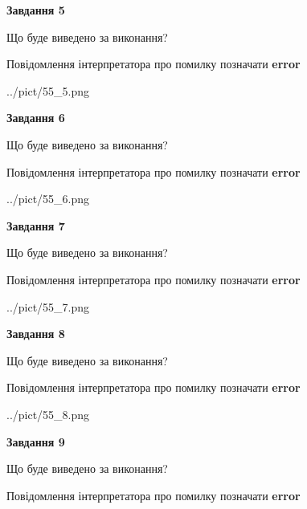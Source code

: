 \documentclass[11pt, ukrainian]{article}
\begin{document}
{\begin {large}
{\begin {center}\textbf{Завдання 5}\end {center}}\par
Що буде виведено за виконання? \par
Повідомлення інтерпретатора про помилку позначати \textbf{error}

\begin{center}
	{../pict/55_5.png}
\end{center}
\newpage

{\begin {center}\textbf{Завдання 6}\end {center}}\par
Що буде виведено за виконання? \par
Повідомлення інтерпретатора про помилку позначати \textbf{error}

\begin{center}
	{../pict/55_6.png}
\end{center}
\newpage

{\begin {center}\textbf{Завдання 7}\end {center}}\par
Що буде виведено за виконання? \par
Повідомлення інтерпретатора про помилку позначати \textbf{error}

\begin{center}
	{../pict/55_7.png}
\end{center}
\newpage

{\begin {center}\textbf{Завдання 8}\end {center}}\par
Що буде виведено за виконання? \par
Повідомлення інтерпретатора про помилку позначати \textbf{error}

\begin{center}
	{../pict/55_8.png}
\end{center}
\newpage

{\begin {center}\textbf{Завдання 9}\end {center}}\par
Що буде виведено за виконання? \par
Повідомлення інтерпретатора про помилку позначати \textbf{error}


\end{large}}
\end{document}
